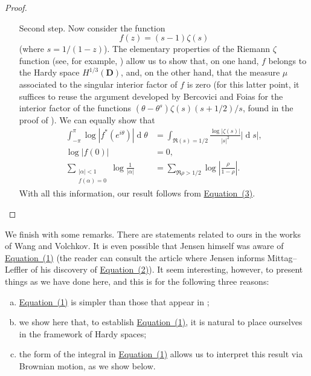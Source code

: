 \documentclass{article}
\newcommand{\dd}{\operatorname{d}\!}
\newcommand{\oldpage}[1]{\marginpar{\footnotesize$\Big\vert$ \textit{p.~#1}}}
\begin{document}
\begin{proof}
\begin{itemize}
    \item[Second step.]
      Now consider the function
      \[
        f(z) = (s-1)\zeta(s)
      \]
      (where $s=1/(1-z)$).
      The elementary properties of the Riemann $\zeta$ function (see, for example, \cite{5}) allow us to show that, on one hand, $f$ belongs to the Hardy space $H^{1/3}(\mathbf{D})$, and, on the other hand, that the measure $\mu$ associated to the singular interior factor of $f$ is zero (for this latter point, it suffices to reuse the argument developed by Bercovici and Foias for the interior factor of the functions $(\theta-\theta^s)\zeta(s)(s+1/2)/s$, found in the proof of \cite[Proposition~2.1]{1}).
      We can equally show that
      \[
        \begin{aligned}
          \int_{-\pi}^\pi \log|f^*(e^{i\theta})|\dd\theta
          &= \int_{\Re(s)=1/2} \frac{\log|\zeta(s)|}{|s|^2}|\dd s|,
        \\\log|f(0)|
          &= 0,
        \\\sum_{\substack{|\alpha|<1\\f(\alpha)=0}} \log\frac{1}{|\alpha|}
          &= \sum_{\Re\rho>1/2} \log\left|\frac{\rho}{1-\rho}\right|.
        \end{aligned}
      \]
      \oldpage{286}
      With all this information, our result follows from \hyperref[3]{Equation~(3)}.
  \end{itemize}
\end{proof}

We finish with some remarks.
There are statements related to ours in the works \cite{7,6} of Wang and Volchkov.
It is even possible that Jensen himself was aware of \hyperref[1]{Equation~(1)} (the reader can consult the article \cite{3} where Jensen informs Mittag–Leffler of his discovery of \hyperref[2]{Equation~(2)}).
It seem interesting, however, to present things as we have done here, and this is for the following three reasons:
\begin{enumerate}[(a)]
  \item \hyperref[1]{Equation~(1)} is simpler than those that appear in \cite{7,6};
  \item we show here that, to establish \hyperref[1]{Equation~(1)}, it is natural to place ourselves in the framework of Hardy spaces;
  \item the form of the integral in \hyperref[1]{Equation~(1)} allows us to interpret this result via Brownian motion, as we show below.
\end{enumerate}
\end{document}
